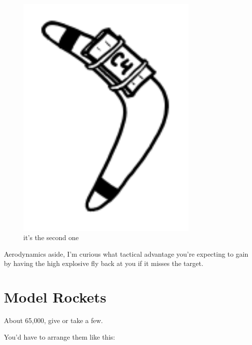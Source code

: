\begin{figure}[!htbp]
\centering
\includegraphics[scale=0.5, max width=0.8\textwidth]{imgs/a/23/short_c4.png}
\caption{it's the second one}
\end{figure}

{Aerodynamics aside, I’m curious what tactical advantage you’re expecting to gain by having the high explosive fly back at you if it misses the target.}

{
\chapter{Model Rockets}
}

\hfill{}

{About 65,000, give or take a few.}

{You’d have to arrange them like this:}

